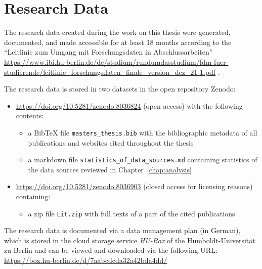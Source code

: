 \chapter{Research Data}
\label{chap:DMP}

The research data created during the work on this thesis 
were generated, documented, and made accessible for at least 18 months
according to the \enquote{Leitlinie zum Umgang mit Forschungsdaten in Abschlussarbeiten}
\url{https://www.ibi.hu-berlin.de/de/studium/rundumdasstudium/fdm-fuer-studierende/leitlinie_forschungsdaten_finale_version_dez_21-1.pdf} .

The research data is stored in two datasets in the open repository Zenodo:
%
\begin{itemize}
  \item
    \url{https://doi.org/10.5281/zenodo.8036824} (open access) with the following contents:
    \begin{itemize}
      \item
        a BibTeX file \verb!masters_thesis.bib! with the bibliographic metadata of all publications and websites cited throughout the thesis
      \item
        a markdown file \verb!statistics_of_data_sources.md! containing statistics of the data sources reviewed in Chapter~\ref{chap:analysis}
    \end{itemize}
  \item
    \url{https://doi.org/10.5281/zenodo.8036903} (closed access for licensing reasons) containing:
    \begin{itemize}
      \item
        a zip file \verb!Lit.zip! with full texts of a part of the cited publications
    \end{itemize}    
\end{itemize}

The research data is documented via a data management plan (in German),
which is stored in the cloud storage service \emph{HU-Box} of the Humboldt-Universität zu Berlin
and can be viewed and downloaded via the following URL: \url{https://box.hu-berlin.de/d/7aabcdcda32a42bda4dd/}


%
%


